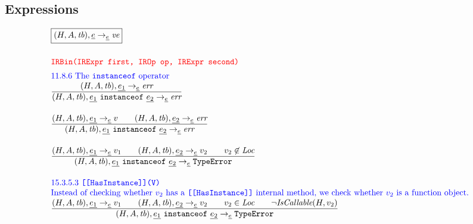 \subsection{Expressions}
\[
\begin{array}{l@{~~}l@{~~}ll}
\fbox{$\evale,\ir{\expr} \rightarrow_{\ir{\expr}} \emph{ve}$}\\[2em]
\mtt{\normalsize\inred IRBin(IRExpr first, IROp op, IRExpr second)}\\[.5em]
\mbox{\inblue 11.8.6 The {\tt instanceof} operator}\\

\frac{\begin{matrix}
\evale, \ir{e_1} \rightarrow_{\ir\expr} \err
\end{matrix}}{\begin{matrix}
\state, \ir{e_1} \ {\tt instanceof}\ \ir{e_2}
\rightarrow_{\ir\expr}
\err
\end{matrix}}
\\[2em]

\frac{\begin{matrix}
\evale, \ir{e_1} \rightarrow_{\ir\expr} v
\rulesep
\evale, \ir{e_2} \rightarrow_{\ir\expr} \err
\end{matrix}}{\begin{matrix}
\state, \ir{e_1} \ {\tt instanceof}\ \ir{e_2}
\rightarrow_{\ir\expr}
\err
\end{matrix}}
\\[2em]

\frac{\begin{matrix}
\evale, \ir{e_1} \rightarrow_{\ir\expr} v_1
\rulesep
\evale, \ir{e_2} \rightarrow_{\ir\expr} v_2
\rulesep
v_2 \not\in \Loc
\end{matrix}}{\begin{matrix}
\state, \ir{e_1} \ {\tt instanceof}\ \ir{e_2}
\rightarrow_{\ir\expr}
\te
\end{matrix}}
\\[2em]

\mbox{\inblue 15.3.5.3 {\tt [[HasInstance]](V)}}\\
\mbox{\inblue Instead of checking whether $v_2$ has a {\tt [[HasInstance]]} internal method,
we check whether $v_2$ is a function object.}\\
\frac{\begin{matrix}
\evale, \ir{e_1} \rightarrow_{\ir\expr} v_1
\rulesep
\evale, \ir{e_2} \rightarrow_{\ir\expr} v_2
\rulesep
v_2 \in \Loc
\rulesep
\neg\hf{IsCallable}(H,v_2)
\end{matrix}}{\begin{matrix}
\state, \ir{e_1} \ {\tt instanceof}\ \ir{e_2}
\rightarrow_{\ir\expr}
\te
\end{matrix}}
\\[2em]



\end{array}\]
